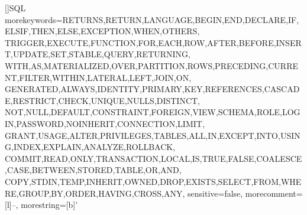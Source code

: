 \usepackage{tocloft}
\renewcommand{\cftchapfont}{\sffamily\bfseries}
\renewcommand{\cftchappagefont}{\sffamily\bfseries}
\renewcommand{\cftchapleader}{\cftdotfill{\cftdotsep}}
\setlength{\cftbeforechapskip}{6pt}
\renewcommand{\cftfigpresnum}{Figure~}
\renewcommand{\cfttabpresnum}{Table~}
\setlength{\cftfignumwidth}{5.4em}
\setlength{\cfttabnumwidth}{5em}
\setlength{\cftfigindent}{0pt}
\setlength{\cfttabindent}{0pt}

[]{SQL}{
  morekeywords={RETURNS,RETURN,LANGUAGE,BEGIN,END,DECLARE,IF,ELSIF,THEN,ELSE,EXCEPTION,WHEN,OTHERS,
    TRIGGER,EXECUTE,FUNCTION,FOR,EACH,ROW,AFTER,BEFORE,INSERT,UPDATE,SET,STABLE,QUERY,RETURNING,
    WITH,AS,MATERIALIZED,OVER,PARTITION,ROWS,PRECEDING,CURRENT,FILTER,WITHIN,LATERAL,LEFT,JOIN,ON,
    GENERATED,ALWAYS,IDENTITY,PRIMARY,KEY,REFERENCES,CASCADE,RESTRICT,CHECK,UNIQUE,NULLS,DISTINCT,
    NOT,NULL,DEFAULT,CONSTRAINT,FOREIGN,VIEW,SCHEMA,ROLE,LOGIN,PASSWORD,NOINHERIT,CONNECTION,LIMIT,
    GRANT,USAGE,ALTER,PRIVILEGES,TABLES,ALL,IN,EXCEPT,INTO,USING,INDEX,EXPLAIN,ANALYZE,ROLLBACK,
    COMMIT,READ,ONLY,TRANSACTION,LOCAL,IS,TRUE,FALSE,COALESCE,CASE,BETWEEN,STORED,TABLE,OR,AND,
    COPY,STDIN,TEMP,INHERIT,OWNED,DROP,EXISTS,SELECT,FROM,WHERE,GROUP,BY,ORDER,HAVING,CROSS,ANY},
  sensitive=false,
  morecomment=[l]{--},
  morestring=[b]'
}
\lstset{style=qsql}
\renewcommand{\lstlistingname}{Listing}
\renewcommand{\lstlistlistingname}{List of Listings}

\SetAlFnt{\small}
\SetAlCapFnt{\small\sffamily\bfseries}
\SetAlCapNameFnt{\small}
\DontPrintSemicolon


